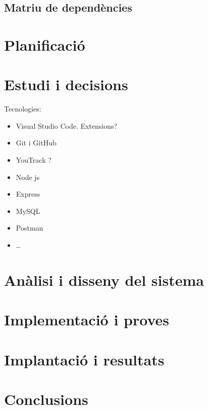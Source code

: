 \documentclass[a4paper,12pt]{ThesisStyle}
\begin{document}
\section{Matriu de dependències}
\label{sec:matriu_dependencies}


\chapter{Planificació}  %
\label{cap:planificacio}



\chapter{Estudi i decisions}
\label{cap:estudi}

Tecnologies:
\begin{itemize}
  \item Visual Studio Code. Extensions?
  \item Git i GitHub
  \item YouTrack ?
  \item Node js
  \item Express
  \item MySQL
  \item Postman
  \item \ldots
\end{itemize}

\chapter{Anàlisi i disseny del sistema}
\label{cap:analisi}



\chapter{Implementació i proves}
\label{cap:implementacio}



\chapter{Implantació i resultats}
\label{cap:implantacio}



\chapter{Conclusions}
\label{cap:conclusions}
\end{document}
